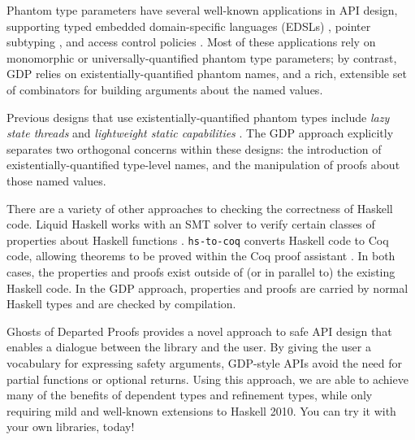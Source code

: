\documentclass[format=sigplan, review=false, screen=true, 10pt]{acmart}
\makeatletter
\let\origsection\section
\renewcommand\section{\@ifstar{\starsection}{\nostarsection}}
\newcommand\nostarsection[1]
{\sectionprelude\origsection{#1}\sectionpostlude}
\newcommand\starsection[1]
{\sectionprelude\origsection*{#1}\sectionpostlude}
\newcommand\sectionprelude{%
  \vspace{-0.5em}
}
\newcommand\sectionpostlude{%
  \vspace{0em}
}
\makeatother
\begin{document}
\section{Related work}
Phantom type parameters have several well-known applications in API design, supporting typed
embedded domain-specific languages (EDSLs) \cite{Leijen:1999:DSE:1267936.1267945}, pointer subtyping \cite{Leijen:2004:WPC:1017472.1017483}, and access control policies \cite{Fluet:2006:PTS:1180085.1180088}. Most of these applications
rely on monomorphic or universally-quantified phantom type parameters; by contrast, GDP relies on existentially-quantified
phantom names, and a rich, extensible set of combinators for building arguments about the named values.

Previous designs that use existentially-quantified phantom types include \emph{lazy state threads} \cite{launchbury1994lazy} and \emph{lightweight static capabilities} \cite{kiselyov2006lightweight}. The GDP approach explicitly separates two orthogonal concerns within these designs: the introduction of existentially-quantified type-level names, and the manipulation of proofs about those named values.

There are a variety of other approaches to checking the correctness of Haskell code. Liquid Haskell works with an SMT solver to verify
certain classes of properties about Haskell functions \cite{vazou2016liquid}. \texttt{hs-to-coq} converts Haskell code to
Coq code, allowing theorems to be proved within the Coq proof assistant \cite{spector2018total}. In both cases, the properties and proofs exist
outside of (or in parallel to) the existing Haskell code. In the GDP approach, properties and proofs are carried by
normal Haskell types and are checked by compilation.


\section{Summary}
Ghosts of Departed Proofs provides a novel approach to safe API design  that enables
a dialogue between the library and the user. By giving the user a vocabulary for expressing
safety arguments, GDP-style APIs avoid
the need for partial functions or optional returns. Using this approach, we are able to achieve
many of the benefits of dependent types and refinement types, while only requiring mild
and well-known extensions to Haskell 2010. 
You can try it with your own libraries, today!

\vspace{-0.4em}
\end{document}
